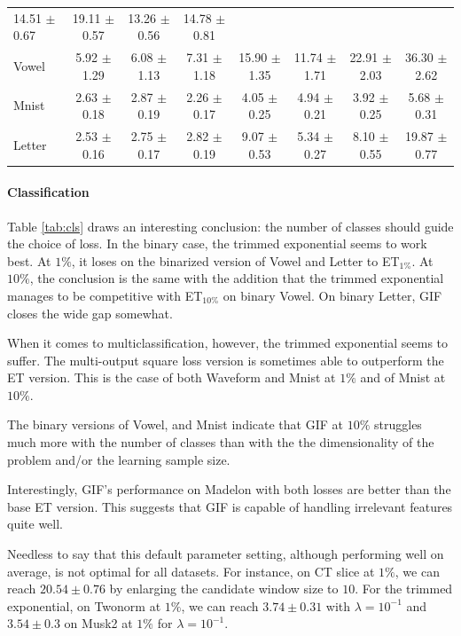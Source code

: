 \documentclass{article}
\newcommand{\bestA}{\cellcolor{orange}}
\newcommand{\bestB}{\cellcolor{dodgerblue}}
\begin{document}
\begin{table}[t]
\begin{center}
\begin{small}
\begin{sc}
\begin{tabular}{l|c|ccc|ccc}
14.51 $\pm$ 0.67 & 19.11 $\pm$ 0.57 & \bestB 13.26 $\pm$ 0.56 & 14.78 $\pm$ 
0.81 \\
Vowel & 5.92 $\pm$ 1.29 & \bestA 6.08 $\pm$ 1.13 & 7.31 $\pm$ 1.18 & 15.90 
$\pm$ 1.35 & \bestB 11.74 $\pm$ 1.71 & 22.91 $\pm$ 2.03 & 36.30 $\pm$ 2.62 \\
Mnist & 2.63 $\pm$ 0.18 & 2.87 $\pm$ 0.19 & \bestA 2.26 $\pm$ 0.17 & 4.05 $\pm$ 
0.25 & 4.94 $\pm$ 0.21 & \bestB 3.92 $\pm$ 0.25 & 5.68 $\pm$ 0.31 \\
Letter & 2.53 $\pm$ 0.16 & \bestA 2.75 $\pm$ 0.17 & 2.82 $\pm$ 0.19 & 9.07 
$\pm$ 0.53 & \bestB 5.34 $\pm$ 0.27 & 8.10 $\pm$ 0.55 & 19.87 $\pm$ 0.77 \\
\hline
\end{tabular}
\end{sc}
\end{small}
\end{center}
\vskip -0.1in
\end{table}


\paragraph{Classification}
Table \ref{tab:cls} draws an interesting conclusion: the number of classes 
should guide the choice of loss. In the binary case, the trimmed exponential 
seems to work best. At $1\%$, it loses on the binarized version of Vowel and 
Letter to ET$_{1\%}$. At $10\%$, the conclusion is the same with the addition 
that the trimmed exponential manages to be competitive with ET$_{10\%}$ on 
binary Vowel. On binary Letter, GIF closes the wide gap somewhat.

When it comes to multiclassification, however, the trimmed exponential seems to 
suffer. The multi-output square loss version is sometimes able to outperform 
the ET version. This is the case of both Waveform and Mnist at $1\%$ and of 
Mnist at $10\%$. 

The binary versions of Vowel, and Mnist indicate that GIF at $10\%$ 
struggles much more with the number of classes than with the the dimensionality 
of the problem and/or the learning sample size. 

Interestingly, GIF's performance on Madelon with both losses are better than 
the base ET version. This suggests that GIF is capable of handling irrelevant 
features quite well.

Needless to say that this default parameter setting, although performing well 
on average, is not optimal for all datasets. For instance, on CT slice at 
$1\%$, we can reach $20.54 \pm 0.76$ by enlarging the candidate window size 
to $10$. 
For the trimmed exponential, on Twonorm at $1\%$, we can reach $3.74 \pm
0.31$ with $\lambda=10^{-1}$ and $3.54 \pm 0.3$ on Musk2 at $1\%$ for 
$\lambda=10^{-1}$.
\end{document}
